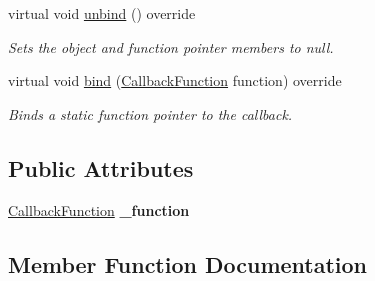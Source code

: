 \begin{DoxyCompactItemize}
virtual void \mbox{\hyperlink{class_arcana_1_1_static_function_callback_instance_ae84257a632181a5d942cb61434cc8edc}{unbind}} () override
\begin{DoxyCompactList}\small\item\em Sets the object and function pointer members to null. \end{DoxyCompactList}\item 
virtual void \mbox{\hyperlink{class_arcana_1_1_static_function_callback_instance_aaf3de60d3146a2cb8946976d73a6ab2c}{bind}} (\mbox{\hyperlink{class_arcana_1_1_static_function_callback_instance_a2df756266028ab7af5c4253fbfb230dc}{Callback\+Function}} function) override
\begin{DoxyCompactList}\small\item\em Binds a static function pointer to the callback. \end{DoxyCompactList}\end{DoxyCompactItemize}
\subsection*{Public Attributes}
\begin{DoxyCompactItemize}
\item 
\mbox{\label{class_arcana_1_1_static_function_callback_instance_aa7d02dca5567209f2c551fbc32f240e4}} 
\mbox{\hyperlink{class_arcana_1_1_static_function_callback_instance_a2df756266028ab7af5c4253fbfb230dc}{Callback\+Function}} {\bfseries \+\_\+function}
\end{DoxyCompactItemize}


\subsection{Member Function Documentation}
\mbox{\label{class_arcana_1_1_static_function_callback_instance_aaf3de60d3146a2cb8946976d73a6ab2c}} 
